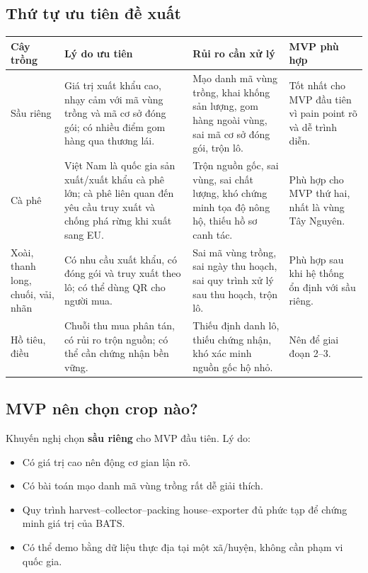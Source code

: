 \documentclass[12pt,a4paper]{article}
\begin{document}
\subsection{Thứ tự ưu tiên đề xuất}

\begin{longtable}{p{3.2cm}p{4.5cm}p{4.5cm}p{3cm}}
\toprule
\textbf{Cây trồng} & \textbf{Lý do ưu tiên} & \textbf{Rủi ro cần xử lý} & \textbf{MVP phù hợp} \\
\midrule
\endhead
Sầu riêng & Giá trị xuất khẩu cao, nhạy cảm với mã vùng trồng và mã cơ sở đóng gói; có nhiều điểm gom hàng qua thương lái. & Mạo danh mã vùng trồng, khai khống sản lượng, gom hàng ngoài vùng, sai mã cơ sở đóng gói, trộn lô. & Tốt nhất cho MVP đầu tiên vì pain point rõ và dễ trình diễn. \\
\addlinespace
Cà phê & Việt Nam là quốc gia sản xuất/xuất khẩu cà phê lớn; cà phê liên quan đến yêu cầu truy xuất và chống phá rừng khi xuất sang EU. & Trộn nguồn gốc, sai vùng, sai chất lượng, khó chứng minh tọa độ nông hộ, thiếu hồ sơ canh tác. & Phù hợp cho MVP thứ hai, nhất là vùng Tây Nguyên. \\
\addlinespace
Xoài, thanh long, chuối, vải, nhãn & Có nhu cầu xuất khẩu, có đóng gói và truy xuất theo lô; có thể dùng QR cho người mua. & Sai mã vùng trồng, sai ngày thu hoạch, sai quy trình xử lý sau thu hoạch, trộn lô. & Phù hợp sau khi hệ thống ổn định với sầu riêng. \\
\addlinespace
Hồ tiêu, điều & Chuỗi thu mua phân tán, có rủi ro trộn nguồn; có thể cần chứng nhận bền vững. & Thiếu định danh lô, thiếu chứng nhận, khó xác minh nguồn gốc hộ nhỏ. & Nên để giai đoạn 2--3. \\
\bottomrule
\end{longtable}

\subsection{MVP nên chọn crop nào?}

Khuyến nghị chọn \textbf{sầu riêng} cho MVP đầu tiên. Lý do:

\begin{itemize}[leftmargin=2em]
    \item Có giá trị cao nên động cơ gian lận rõ.
    \item Có bài toán mạo danh mã vùng trồng rất dễ giải thích.
    \item Quy trình harvest--collector--packing house--exporter đủ phức tạp để chứng minh giá trị của BATS.
    \item Có thể demo bằng dữ liệu thực địa tại một xã/huyện, không cần phạm vi quốc gia.
\end{itemize}
\end{document}
